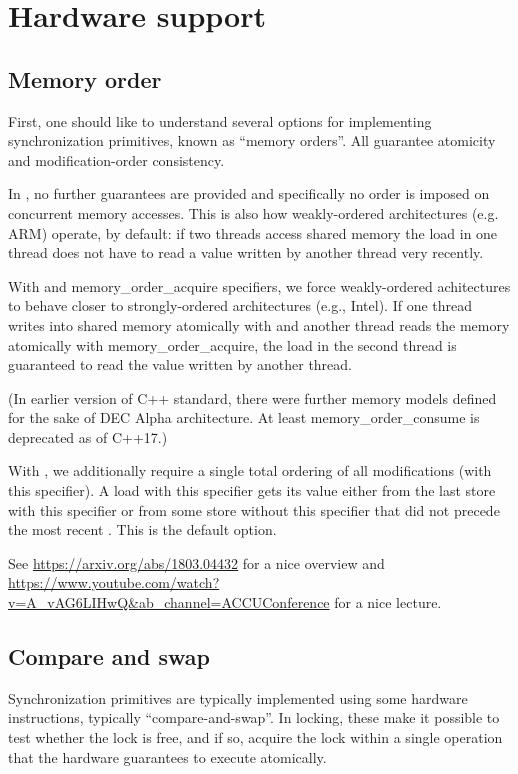 \section{Hardware support}

\subsection{Memory order}

First, one should like to understand several options for implementing synchronization primitives, known as ``memory orders''.
All guarantee atomicity and modification-order consistency.

In , no further guarantees are provided and specifically no order is imposed on concurrent memory accesses. This is also how weakly-ordered architectures (e.g. ARM) operate, by default: if two threads access shared memory the load in one thread does not have to read a value written by another thread very recently.

With  and memory_order_acquire specifiers, we force  weakly-ordered achitectures to behave closer to strongly-ordered architectures (e.g., Intel). If one thread writes into shared memory atomically with  and another thread reads the memory atomically with memory_order_acquire, the load in the second thread is guaranteed to read the value written by another thread. 

(In earlier version of C++ standard, there were further memory models defined for the sake of DEC Alpha architecture. At least memory_order_consume is deprecated as of C++17.) 

With , we additionally require a single total ordering of all modifications (with this specifier). A load with this specifier gets its value either from the last store with this specifier or from some store without this specifier that did not precede the most recent . This is the default option. 

See \url{https://arxiv.org/abs/1803.04432} for a nice overview and \url{https://www.youtube.com/watch?v=A_vAG6LIHwQ&ab_channel=ACCUConference} for a nice lecture. 

\subsection{Compare and swap}

Synchronization primitives are typically implemented using some hardware instructions, typically ``compare-and-swap''. In locking, these make it possible to test whether the lock is free, and if so, acquire the lock within a single operation that the hardware guarantees to execute atomically.

